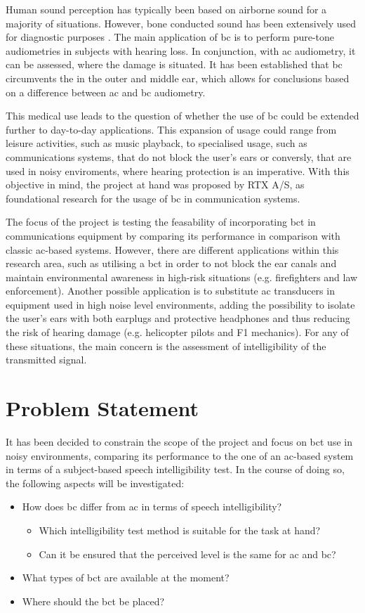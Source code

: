 \label{sec:intro}
Human sound perception has typically been based on airborne sound for a majority of situations. However, bone conducted sound has been extensively used for diagnostic purposes \citep{iso_389-3}. The main application of \gls{bc} is to perform pure-tone audiometries in subjects with hearing loss. In conjunction, with \gls{ac} audiometry, it can be assessed, where the damage is situated. It has been established that \gls{bc} circumvents the in the outer and middle ear, which allows for conclusions based on a difference between \gls{ac} and \gls{bc} audiometry.

This medical use leads to the question of whether the use of \gls{bc} could be extended further to day-to-day applications. This expansion of usage could range from leisure activities, such as music playback, to specialised usage, such as communications systems, that do not block the user's ears or conversly, that are used in noisy enviroments, where hearing protection is an imperative. With this objective in mind, the project at hand was proposed by RTX A/S, as foundational research for the usage of \gls{bc} in communication systems.

The focus of the project is testing the feasability of incorporating \gls{bct} in communications equipment by comparing its performance in comparison with classic \gls{ac}-based systems. However, there are different applications within this research area, such as utilising a \gls{bct} in order to not block the ear canals and maintain environmental awareness in high-risk situations (e.g. firefighters and law enforcement). Another possible application is to substitute \gls{ac} transducers in equipment used in high noise level environments, adding the possibility to isolate the user's ears with both earplugs and protective headphones and thus reducing the risk of hearing damage (e.g. helicopter pilots and F1 mechanics). For any of these situations, the main concern is the assessment of intelligibility of the transmitted signal.

\section{Problem Statement}
It has been decided to constrain the scope of the project and focus on \gls{bct} use in noisy environments, comparing its performance to the one of an \gls{ac}-based system in terms of a subject-based speech intelligibility test. In the course of doing so, the following aspects will be investigated:
\begin{itemize}
\item How does \gls{bc} differ from \gls{ac} in terms of speech intelligibility?
\begin{itemize}
\item Which intelligibility test method is suitable for the task at hand?
\item Can it be ensured that the perceived level is the same for \gls{ac} and \gls{bc}?
\end{itemize}
\item What types of \gls{bct} are available at the moment?
\item Where should the \gls{bct} be placed?
\end{itemize}